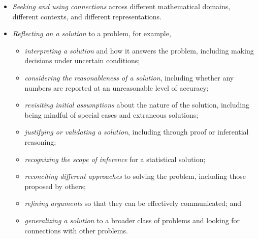 {{\begin{itemize}
\begin{itemize}
      \item \emph{monitoring progress toward a solution}, including reviewing a chosen strategy and other possible strategies generated by oneself or others.
    \end{itemize}

    \item \emph{Seeking and using connections} across different mathematical domains, different contexts, and different representations.

    \item \emph{Reflecting on a solution} to a problem, for example,
    \begin{itemize}
      \item \vspace{\baselineskip}\emph{interpreting a solution} and how it answers the problem, including making decisions under uncertain conditions;

      \item \emph{considering the reasonableness of a solution}, including whether any numbers are reported at an unreasonable level of accuracy;

      \item \emph{revisiting initial assumptions} about the nature of the solution, including being mindful of special cases and extraneous solutions;

      \item \emph{justifying or validating a solution}, including through proof or inferential reasoning;\vspace{\baselineskip}

      \item \emph{recognizing the scope of inference} for a statistical solution;

      \item \emph{reconciling different approaches} to solving the problem, including those proposed by others;

      \item \emph{refining arguments} so that they can be effectively communicated; and

      \item \emph{generalizing a solution} to a broader class of problems and looking for connections with other problems.
    \end{itemize}
  \end{itemize}
  }
  }
